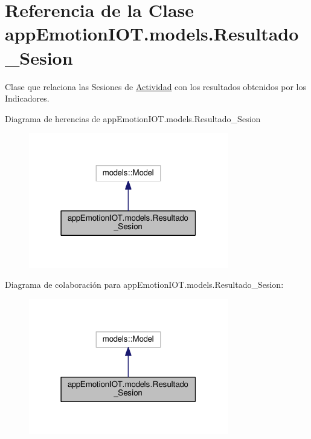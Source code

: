 \hypertarget{classappEmotionIOT_1_1models_1_1Resultado__Sesion}{}\section{Referencia de la Clase app\+Emotion\+I\+O\+T.\+models.\+Resultado\+\_\+\+Sesion}
\label{classappEmotionIOT_1_1models_1_1Resultado__Sesion}


Clase que relaciona las Sesiones de \hyperlink{classappEmotionIOT_1_1models_1_1Actividad}{Actividad} con los resultados obtenidos por los Indicadores.  




Diagrama de herencias de app\+Emotion\+I\+O\+T.\+models.\+Resultado\+\_\+\+Sesion
\nopagebreak
\begin{figure}[H]
\begin{center}
\leavevmode
\includegraphics[width=247pt]{classappEmotionIOT_1_1models_1_1Resultado__Sesion__inherit__graph}
\end{center}
\end{figure}


Diagrama de colaboración para app\+Emotion\+I\+O\+T.\+models.\+Resultado\+\_\+\+Sesion\+:
\nopagebreak
\begin{figure}[H]
\begin{center}
\leavevmode
\includegraphics[width=247pt]{classappEmotionIOT_1_1models_1_1Resultado__Sesion__coll__graph}
\end{center}
\end{figure}
